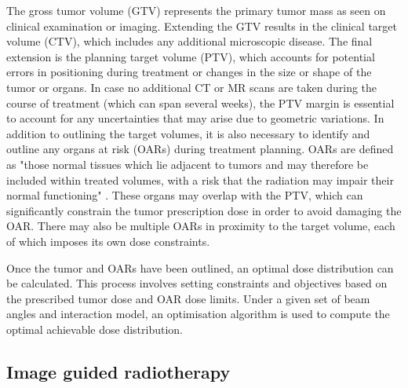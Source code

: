 \documentclass[\relativeRoot/ada.tex]{subfiles}
\begin{document}
The gross tumor volume (GTV) represents the primary tumor mass as seen on clinical examination or imaging. Extending the GTV results in the clinical target volume (CTV), which includes any additional microscopic disease. The final extension is the planning target volume (PTV), which accounts for potential errors in positioning during treatment or changes in the size or shape of the tumor or organs. In case no additional CT or MR scans are taken during the course of treatment (which can span several weeks), the PTV margin is essential to account for any uncertainties that may arise due to geometric variations. In addition to outlining the target volumes, it is also necessary to identify and outline any organs at risk (OARs) during treatment planning. OARs are defined as "those normal tissues which lie adjacent to tumors and may therefore be included within treated volumes, with a risk that the radiation may impair their normal functioning" \cite{barrett_practical}. These organs may overlap with the PTV, which can significantly constrain the tumor prescription dose in order to avoid damaging the OAR. There may also be multiple OARs in proximity to the target volume, each of which imposes its own dose constraints.

Once the tumor and OARs have been outlined, an optimal dose distribution can be calculated. This process involves setting constraints and objectives based on the prescribed tumor dose and OAR dose limits. Under a given set of beam angles and interaction model, an optimisation algorithm is used to compute the optimal achievable dose distribution. \cite{wu_reoptimisation}

\subsection{Image guided radiotherapy}
\end{document}
